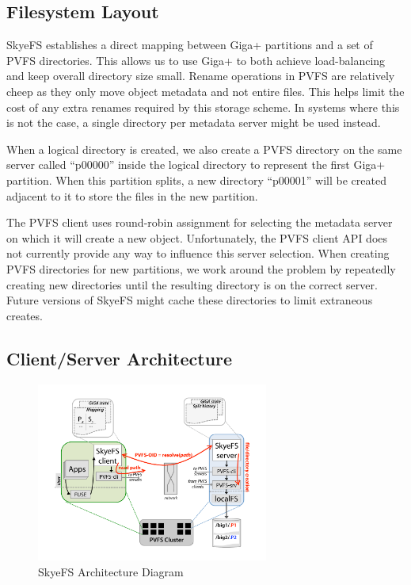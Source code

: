 \documentclass[onecolumn, 11pt, letterpaper]{article}
\begin{document}
\subsection{Filesystem Layout}
SkyeFS establishes a direct mapping between Giga+ partitions and a set of PVFS
directories.  This allows us to use Giga+ to both achieve load-balancing and
keep overall directory size small.  Rename operations in PVFS are relatively
cheep as they only move object metadata and not entire files.  This helps limit
the cost of any extra renames required by this storage scheme.  In systems
where this is not the case, a single directory per metadata server might be
used instead.

When a logical directory is created, we also create a PVFS directory on the
same server called ``p00000'' inside the logical directory to represent the
first Giga+ partition.  When this partition splits, a new directory ``p00001''
will be created adjacent to it to store the files in the new partition.  

The PVFS client uses round-robin assignment for selecting the metadata server
on which it will create a new  object.  Unfortunately, the PVFS client API
does not currently provide any way to influence this server selection.  When
creating PVFS directories for new partitions, we work around the problem by
repeatedly creating new directories until the resulting directory is on the
correct server.  Future versions of SkyeFS might cache these directories to
limit extraneous creates.

\subsection{Client/Server Architecture}
\begin{figure}
\begin{center}
\includegraphics[width=3in]{figure-architecture}
\end{center}
\caption{SkyeFS Architecture Diagram}
\end{figure}
\end{document}
